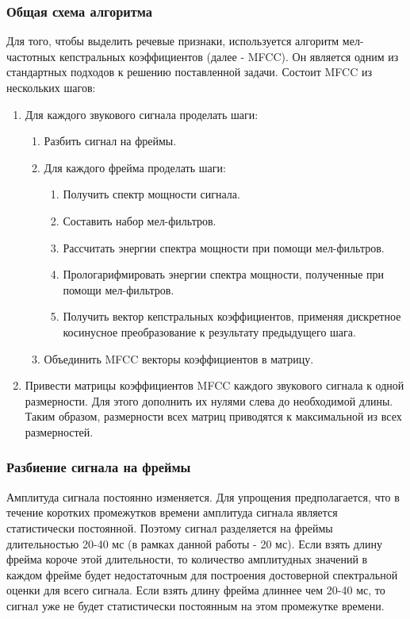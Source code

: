 \subsubsection{Общая схема алгоритма}
Для того, чтобы выделить речевые признаки, используется алгоритм мел-частотных кепстральных коэффициентов \cite{MFCC} (далее - MFCC). Он является одним из стандартных подходов к решению поставленной задачи. Состоит MFCC из нескольких шагов:
\begin{enumerate}
	\item Для каждого звукового сигнала проделать шаги:
	\begin{enumerate}
		\item Разбить сигнал на фреймы.
		\item Для каждого фрейма проделать шаги:
		\begin{enumerate}
			\item Получить спектр мощности сигнала.
			\item Составить набор мел-фильтров.
			\item Рассчитать энергии спектра мощности при помощи  мел-фильтров.
			\item Прологарифмировать энергии спектра мощности, полученные при помощи мел-фильтров.
			\item Получить вектор кепстральных коэффициентов, применяя дискретное косинусное преобразование к результату предыдущего шага.
		\end{enumerate}
		\item Объединить MFCC векторы коэффициентов в матрицу.
	\end{enumerate}

	\item Привести матрицы коэффициентов MFCC каждого звукового сигнала к одной размерности. Для этого дополнить их нулями слева до необходимой длины. Таким образом, размерности всех матриц приводятся к максимальной из всех размерностей.
\end{enumerate}

\subsubsection{Разбиение сигнала на фреймы}
Амплитуда сигнала постоянно изменяется. Для упрощения предполагается, что в течение коротких промежутков времени амплитуда сигнала является статистически постоянной. Поэтому сигнал разделяется на фреймы длительностью 20-40 мс (в рамках данной работы - 20 мс). Если взять длину фрейма короче этой длительности, то количество амплитудных значений в каждом фрейме будет недостаточным для построения достоверной спектральной оценки для всего сигнала. Если взять длину фрейма длиннее чем 20-40 мс, то сигнал уже не будет статистически постоянным на этом промежутке времени.


